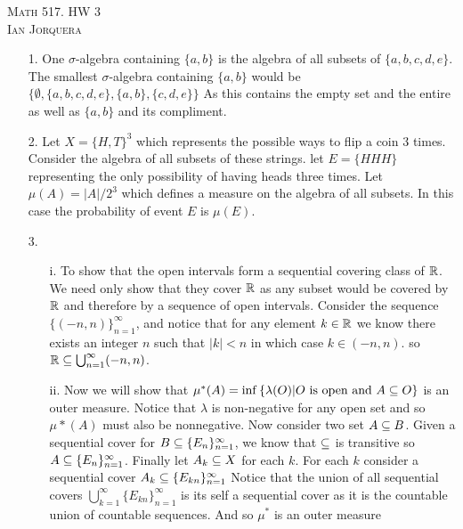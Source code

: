 \documentclass[12pt]{amsart}
\begin{document}
\begin{center}
   \textsc{Math 517. HW 3\\ Ian Jorquera}
\end{center}
\vspace{1em}

\begin{itemize}
   \item[1.] One $\sigma$-algebra containing $\{a,b\}$ is the algebra of all subsets of $\{a,b,c,d,e\}$.
             The smallest $\sigma$-algebra containing $\{a,b\}$ would be 
             $\{\emptyset, \{a,b,c,d,e\}, \{a,b\}, \{c,d,e\}\}$
             As this contains the empty set and the entire as well as $\{a,b\}$ and its compliment.


   \item[2.] Let $X=\{H,T\}^3$ which represents the possible ways to flip a coin $3$ times. 
             Consider the algebra of all subsets of these strings. let $E=\{HHH\}$ representing
             the only possibility of having heads three times.
             Let $\mu(A)=|A|/2^3$ which defines a measure on the algebra of all subsets. In this case
             the probability of event $E$ is $\mu(E)$.


   \item[3.]
   \begin{itemize}
    \item[i.] To show that the open intervals form a sequential covering class of $\mathbb{R}$. 
    We need only show that they cover $\mathbb{R}$ as any subset would be covered by $\mathbb{R}$ 
    and therefore by a sequence of open intervals. Consider the sequence $\{(-n,n)\}_{n=1}^\infty$, 
    and notice that for any element $k\in \mathbb{R}$ we know there exists an integer 
    $n$ such that $|k|<n$ in which case $k\in (-n,n)$. so $\mathbb{R}\subseteq \bigcup_{n=1}^\infty (-n,n)$.

    \item[ii.] Now we will show that 
    $\mu^*(A)=\inf\left\{\lambda(O) | O \text{ is open and } A\subseteq O\right\}$ is an outer 
    measure. Notice that $\lambda$ is non-negative for any open set and so $\mu*(A)$ must also be nonnegative.
    Now consider two set $A\subseteq B$. Given a sequential cover for $B\subseteq \{E_n\}_{n=1}^\infty$, we know
    that $\subseteq$ is transitive so $A\subseteq \{E_n\}_{n=1}^\infty$. Finally let $A_k\subseteq X$ for each $k$.
    For each $k$ consider a sequential cover $A_k\subseteq \{E_{kn}\}_{n=1}^\infty$ Notice that the union
    of all sequential covers $\bigcup_{k=1}^\infty\{E_{kn}\}_{n=1}^\infty$ is its self a sequential cover
    as it is the countable union of countable sequences. And so $\mu^*$ is an outer measure
               

\end{itemize}
\end{itemize}
\end{document}
